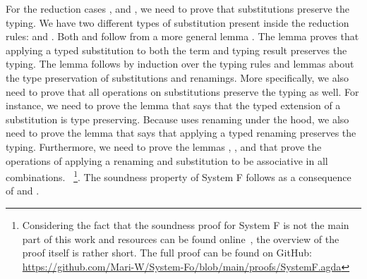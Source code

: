 \noindent For the  reduction cases ,  and , we need to prove that substitutions preserve the typing. 
We have two different types of substitution present inside the reduction rules:  \Data{[}  \Data{]} and  \Data{[}  \Data{]}.
Both  and  follow from a more general lemma . 
The lemma  proves that applying a typed substitution to both the term and typing result preserves the typing.
\Fpreserves
The lemma  follows by induction over the typing rules and lemmas about the type preservation of substitutions and renamings. 
More specifically, we also need to prove that all operations on substitutions preserve the typing as well. 
For instance, we need to prove the lemma  that says that the typed extension of a substitution  is type preserving. 
Because  uses renaming under the hood, we also need to prove the lemma  that says that applying a typed renaming preserves the typing. 
Furthermore, we need to prove the lemmas , ,  and  that prove the operations of applying a renaming and substitution to be associative in all combinations.
~\footnote{Considering the fact that the soundness proof for System F is not the main part of this work and resources can be found online~\cite{fp}, the overview of the proof itself is rather short.
The full proof can be found on GitHub: \url{https://github.com/Mari-W/System-Fo/blob/main/proofs/SystemF.agda}}.
\noindent The soundness property of System F follows as a consequence of  and . 